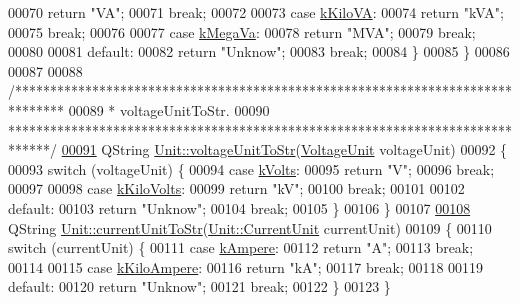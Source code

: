 \begin{DoxyCode}
00070     \textcolor{keywordflow}{return} \textcolor{stringliteral}{"VA"};
00071     \textcolor{keywordflow}{break};
00072 
00073   \textcolor{keywordflow}{case} \hyperlink{class_unit_ace265ae255370ccacfd5370337572c3bac9e5154522fbb810d7aed75c3ff47cb2}{kKiloVA}:
00074     \textcolor{keywordflow}{return} \textcolor{stringliteral}{"kVA"};
00075     \textcolor{keywordflow}{break};
00076 
00077   \textcolor{keywordflow}{case} \hyperlink{class_unit_ace265ae255370ccacfd5370337572c3ba6039da0ed20f8bee64305bab8bdec365}{kMegaVa}:
00078     \textcolor{keywordflow}{return} \textcolor{stringliteral}{"MVA"};
00079     \textcolor{keywordflow}{break};
00080 
00081   \textcolor{keywordflow}{default}:
00082     \textcolor{keywordflow}{return} \textcolor{stringliteral}{"Unknow"};
00083     \textcolor{keywordflow}{break};
00084   \}
00085 \}
00086 
00087 
00088 \textcolor{comment}{/*******************************************************************************}
00089 \textcolor{comment}{ * voltageUnitToStr.}
00090 \textcolor{comment}{ ******************************************************************************/}
\hypertarget{customtypes_8cpp_source_l00091}{}\hyperlink{class_unit_a7fa103c31f9f069961b35b6371ff0c0a}{00091} QString \hyperlink{class_unit_a7fa103c31f9f069961b35b6371ff0c0a}{Unit::voltageUnitToStr}(\hyperlink{class_unit_a55b07dfa9457e1eca2c7194fe0cfc3c1}{VoltageUnit} voltageUnit)
00092 \{
00093   \textcolor{keywordflow}{switch} (voltageUnit) \{
00094   \textcolor{keywordflow}{case} \hyperlink{class_unit_a55b07dfa9457e1eca2c7194fe0cfc3c1aa54b2473993a702a3923525765bd6e4c}{kVolts}:
00095     \textcolor{keywordflow}{return} \textcolor{stringliteral}{"V"};
00096     \textcolor{keywordflow}{break};
00097 
00098   \textcolor{keywordflow}{case} \hyperlink{class_unit_a55b07dfa9457e1eca2c7194fe0cfc3c1a35a201a658c2cd89766787c657e9a54d}{kKiloVolts}:
00099     \textcolor{keywordflow}{return} \textcolor{stringliteral}{"kV"};
00100     \textcolor{keywordflow}{break};
00101 
00102   \textcolor{keywordflow}{default}:
00103     \textcolor{keywordflow}{return} \textcolor{stringliteral}{"Unknow"};
00104     \textcolor{keywordflow}{break};
00105   \}
00106 \}
00107 
\hypertarget{customtypes_8cpp_source_l00108}{}\hyperlink{class_unit_a7bd3ed3edcb18170cd162d384075b651}{00108} QString \hyperlink{class_unit_a7bd3ed3edcb18170cd162d384075b651}{Unit::currentUnitToStr}(\hyperlink{class_unit_a0794cf6c9682f48296dd4a5315389787}{Unit::CurrentUnit} currentUnit)
00109 \{
00110   \textcolor{keywordflow}{switch} (currentUnit) \{
00111   \textcolor{keywordflow}{case} \hyperlink{class_unit_a0794cf6c9682f48296dd4a5315389787a368a3c470f0b590a6100dda717a7dd4f}{kAmpere}:
00112     \textcolor{keywordflow}{return} \textcolor{stringliteral}{"A"};
00113     \textcolor{keywordflow}{break};
00114 
00115   \textcolor{keywordflow}{case} \hyperlink{class_unit_a0794cf6c9682f48296dd4a5315389787aa27cb5edd73099f24f2285e02396ae14}{kKiloAmpere}:
00116     \textcolor{keywordflow}{return} \textcolor{stringliteral}{"kA"};
00117     \textcolor{keywordflow}{break};
00118 
00119   \textcolor{keywordflow}{default}:
00120     \textcolor{keywordflow}{return} \textcolor{stringliteral}{"Unknow"};
00121     \textcolor{keywordflow}{break};
00122   \}
00123 \}
\end{DoxyCode}
